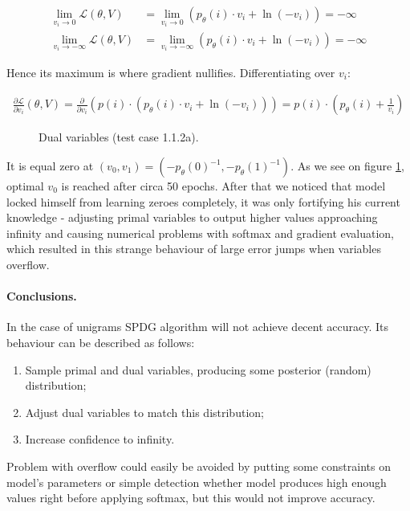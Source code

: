 \documentclass[shortabstract,lic,english]{iithesis}
\begin{document}
\begin{align}
    \lim_{v_i\rightarrow 0} \mathcal{L}(\theta, V) &= \lim_{v_i \rightarrow 0} (p_\theta(i) \cdot v_i + \ln (- v_i)) = -\infty \\
    \lim_{v_i\rightarrow-\infty} \mathcal{L}(\theta, V) &= \lim_{v_i \rightarrow -\infty} (p_\theta(i) \cdot v_i + \ln (- v_i)) = -\infty
\end{align}

Hence its maximum is where gradient nullifies. Differentiating over $v_i$:

\newcommand{\sumxinD}{\sum_{x \in \mathcal{D}}}
\begin{align}
    \frac{\partial\mathcal{L}}{\partial v_i}(\theta, V) = \frac{\partial}{\partial v_i} (p(i) \cdot (p_\theta(i) \cdot v_i + \ln(-v_i))) = 
    p(i) \cdot (p_\theta(i) + \frac{1}{v_i})
\end{align}

\begin{figure}[tb]
    \def\svgwidth{\columnwidth}
    
    \caption{Dual variables (test case 1.1.2a).}
    \label{fig:t112_dual}
\end{figure}


It is equal zero at $(v_0, v_1) = (-p_\theta(0)^{-1}, -p_\theta(1)^{-1})$. As we see on figure \ref{fig:t112_dual}, optimal $v_0$ is reached after circa 50 epochs. After that we noticed that model locked himself from learning zeroes completely, it was only fortifying his current knowledge - adjusting primal variables to output higher values approaching infinity and causing numerical problems with softmax and gradient evaluation, which resulted in this strange behaviour of large error jumps when variables overflow.

\paragraph{Conclusions.} In the case of unigrams SPDG algorithm will not achieve decent accuracy. Its behaviour can be described as follows:
\begin{enumerate}
    \item Sample primal and dual variables, producing some posterior (random) distribution;
    \item Adjust dual variables to match this distribution;
    \item Increase confidence to infinity.
\end{enumerate}

Problem with overflow could easily be avoided by putting some constraints on model's parameters or simple detection whether model produces high enough values right before applying softmax, but this would not improve accuracy.
\end{document}
